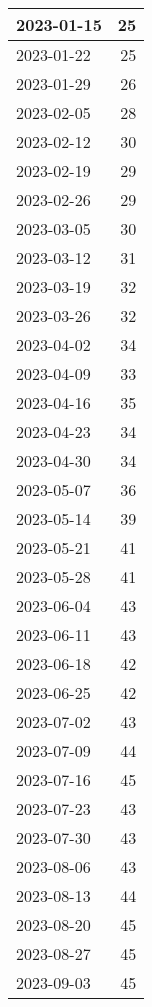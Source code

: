 \begin{longtable}[h!]{|l|r|}
2023-01-15 &            25 \\ \hline
2023-01-22 &            25 \\ \hline
2023-01-29 &            26 \\ \hline
2023-02-05 &            28 \\ \hline
2023-02-12 &            30 \\ \hline
2023-02-19 &            29 \\ \hline
2023-02-26 &            29 \\ \hline
2023-03-05 &            30 \\ \hline
2023-03-12 &            31 \\ \hline
2023-03-19 &            32 \\ \hline
2023-03-26 &            32 \\ \hline
2023-04-02 &            34 \\ \hline
2023-04-09 &            33 \\ \hline
2023-04-16 &            35 \\ \hline
2023-04-23 &            34 \\ \hline
2023-04-30 &            34 \\ \hline
2023-05-07 &            36 \\ \hline
2023-05-14 &            39 \\ \hline
2023-05-21 &            41 \\ \hline
2023-05-28 &            41 \\ \hline
2023-06-04 &            43 \\ \hline
2023-06-11 &            43 \\ \hline
2023-06-18 &            42 \\ \hline
2023-06-25 &            42 \\ \hline
2023-07-02 &            43 \\ \hline
2023-07-09 &            44 \\ \hline
2023-07-16 &            45 \\ \hline
2023-07-23 &            43 \\ \hline
2023-07-30 &            43 \\ \hline
2023-08-06 &            43 \\ \hline
2023-08-13 &            44 \\ \hline
2023-08-20 &            45 \\ \hline
2023-08-27 &            45 \\ \hline
2023-09-03 &            45 \\ \hline

\end{longtable}
